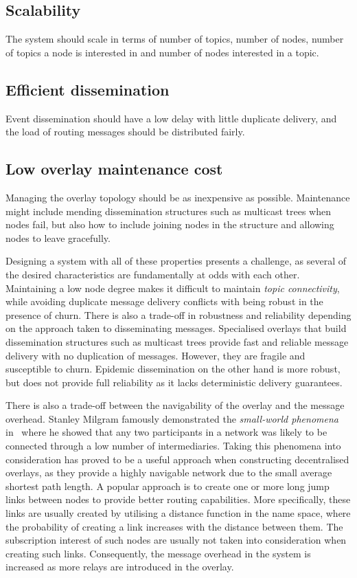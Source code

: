 \subsection{Scalability}
The system should scale in terms of number of
topics, number of nodes, number of topics a node is interested in and
number of nodes interested in a topic.

\subsection{Efficient dissemination}
Event dissemination should have a low
delay with little duplicate delivery, and the load of routing messages
should be distributed fairly.

\subsection{Low overlay maintenance cost}
Managing the overlay topology
should be as inexpensive as possible. Maintenance might include mending
dissemination structures such as multicast trees when nodes fail, but
also how to include joining nodes in the structure and allowing nodes to
leave gracefully.

Designing a system with all of these properties
presents a challenge, as several of the desired characteristics are
fundamentally at odds with each other. Maintaining a low node degree
makes it difficult to maintain \emph{topic connectivity}, while
avoiding duplicate message delivery conflicts with being robust in the
presence of churn. There is also a trade-off in robustness and
reliability depending on the approach taken to disseminating messages.
Specialised overlays that build dissemination structures such as
multicast trees provide fast and reliable message delivery with no
duplication of messages. However, they are fragile and susceptible to
churn. Epidemic dissemination on the other hand is more robust, but does
not provide full reliability as it lacks deterministic delivery
guarantees.

There is also a trade-off between the navigability of the overlay and
the message overhead. Stanley Milgram famously demonstrated the
\emph{small-world phenomena} in~\cite{milgram1967small} where he showed
that any two participants in a network was likely to be connected
through a low number of intermediaries. Taking this phenomena into
consideration has proved to be a useful approach when constructing
decentralised overlays, as they provide a highly navigable network due
to the small average shortest path length. A popular approach is to
create one or more long jump links between nodes to provide better
routing capabilities. More specifically, these links are usually created
by utilising a distance function in the name space, where the
probability of creating a link increases with the distance between them.
The subscription interest of such nodes are usually not taken into
consideration when creating such links. Consequently, the message
overhead in the system is increased as more relays are introduced in the
overlay.

